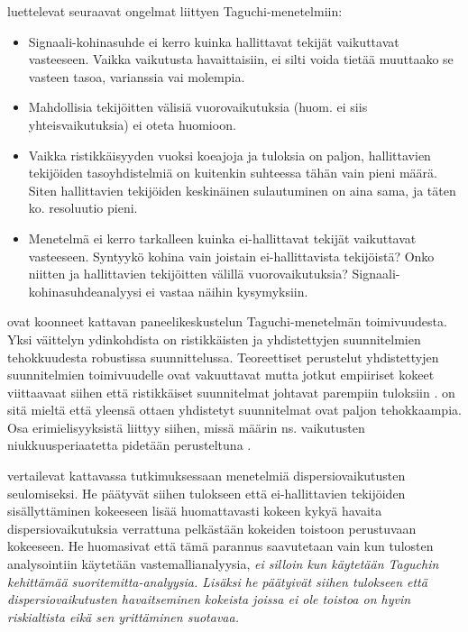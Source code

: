 \documentclass[12pt,a4paper,finnish]{tutthesis}
\begin{document}
\textcite[s.~300-301]{Hedayat2012} luettelevat
seuraavat ongelmat liittyen
Taguchi-menetelmiin:
\begin{itemize}
\item Signaali-kohinasuhde ei kerro kuinka hallittavat tekijät vaikuttavat
      vasteeseen. Vaikka vaikutusta havaittaisiin, ei silti voida tietää
      muuttaako se vasteen tasoa, varianssia vai molempia.
\item Mahdollisia tekijöitten välisiä vuorovaikutuksia (huom. ei siis yhteisvaikutuksia) ei oteta huomioon.
\item Vaikka ristikkäisyyden vuoksi koeajoja ja tuloksia on paljon, hallittavien tekijöiden
    tasoyhdistelmiä on kuitenkin suhteessa tähän vain pieni määrä. Siten hallittavien
    tekijöiden keskinäinen sulautuminen on aina sama, ja täten ko. resoluutio pieni.
\item Menetelmä ei kerro tarkalleen kuinka ei-hallittavat tekijät vaikuttavat vasteeseen.
      Syntyykö kohina vain joistain ei-hallittavista tekijöistä? Onko niitten ja
      hallittavien tekijöitten välillä vuorovaikutuksia? Signaali-kohinasuhdeanalyysi
      ei vastaa näihin kysymyksiin.
\end{itemize}

\textcite{nair1992} ovat koonneet kattavan paneelikeskustelun Taguchi-menetelmän
toimivuudesta. Yksi väittelyn ydinkohdista on ristikkäisten ja yhdistettyjen suunnitelmien
tehokkuudesta robustissa suunnittelussa.
Teoreettiset perustelut yhdistettyjen suunnitelmien toimivuudelle ovat
vakuuttavat mutta jotkut empiiriset kokeet viittaavaat siihen että
ristikkäiset suunnitelmat johtavat parempiin tuloksiin
\parencite{kunert2003experiment}.
\textcite[s.~558]{Montgomery2012} on sitä mieltä että yleensä ottaen yhdistetyt
suunnitelmat ovat paljon tehokkaampia.
Osa erimielisyyksistä liittyy siihen, missä määrin ns. vaikutusten
niukkuusperiaatetta pidetään perusteltuna \parencite{Li2006}.

\textcite{Bursztyn} vertailevat kattavassa tutkimuksessaan menetelmiä dispersiovaikutusten
seulomiseksi. He päätyvät siihen tulokseen että ei-hallittavien tekijöiden
sisällyttäminen kokeeseen lisää huomattavasti kokeen kykyä havaita
dispersiovaikutuksia verrattuna pelkästään kokeiden toistoon perustuvaan
kokeeseen. He huomasivat että tämä parannus saavutetaan vain
kun
tulosten analysointiin
käytetään vastemallianalyysia, \em ei silloin kun käytetään Taguchin kehittämää
suoritemitta-analyysia. \em
Lisäksi he päätyivät siihen tulokseen että dispersiovaikutusten
havaitseminen kokeista joissa ei ole toistoa on hyvin riskialtista eikä
sen yrittäminen suotavaa.
\end{document}
